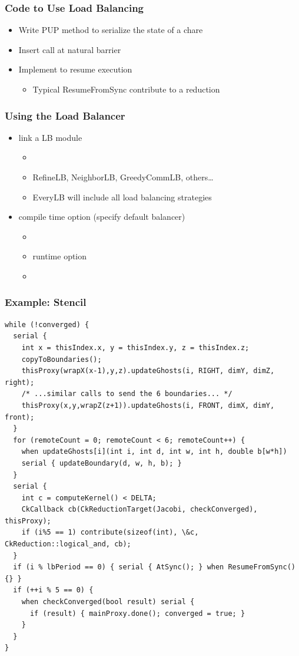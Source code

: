 \begin{frame}
\frametitle{Code to Use Load Balancing}
\begin{itemize}
\item Write PUP method to serialize the state of a chare
\item Insert  call at natural barrier
\item Implement  to resume execution
\begin{itemize}
\item Typical ResumeFromSync contribute to a reduction
\end{itemize}
\end{itemize}
\end{frame}


\begin{frame}[fragile]
\frametitle{Using the Load Balancer}
\begin{itemize}
\item link a LB module 
\begin{itemize}
\item {}
\item RefineLB, NeighborLB, GreedyCommLB, others…
\item EveryLB will include all load balancing strategies
\end{itemize}
\item compile time option (specify default balancer)
\begin{itemize}
\item {}
\item runtime option
\item {}
\end{itemize}
\end{itemize}
\end{frame}

\begin{frame}[fragile]
\frametitle{Example: Stencil}
\begin{lstlisting}[basicstyle=\tiny]
while (!converged) {
  serial {
    int x = thisIndex.x, y = thisIndex.y, z = thisIndex.z;
    copyToBoundaries();
    thisProxy(wrapX(x-1),y,z).updateGhosts(i, RIGHT, dimY, dimZ, right);
    /* ...similar calls to send the 6 boundaries... */
    thisProxy(x,y,wrapZ(z+1)).updateGhosts(i, FRONT, dimX, dimY, front);
  }
  for (remoteCount = 0; remoteCount < 6; remoteCount++) {
    when updateGhosts[i](int i, int d, int w, int h, double b[w*h])
    serial { updateBoundary(d, w, h, b); }
  }
  serial {
    int c = computeKernel() < DELTA;
    CkCallback cb(CkReductionTarget(Jacobi, checkConverged), thisProxy);
    if (i%5 == 1) contribute(sizeof(int), \&c, CkReduction::logical_and, cb);
  }
  if (i % lbPeriod == 0) { serial { AtSync(); } when ResumeFromSync() {} }
  if (++i % 5 == 0) {
    when checkConverged(bool result) serial {
      if (result) { mainProxy.done(); converged = true; }
    }
  }
}
\end{lstlisting}
\end{frame}

